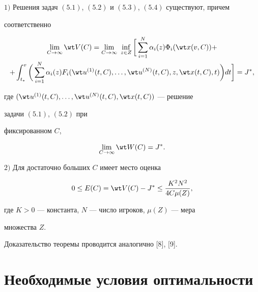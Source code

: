 \begin{thms} 


$1)$ Решения задач $(5.1)$, $(5.2)$ и $(5.3)$, $(5.4)$ существуют, причем 


соответственно 


\begin{multline*} 


\lim_{C\to\infty}\wt V(C)=\lim_{C\to\infty}\ \inf_{z\in Z}\bigg[ 


\sum^N_{i=1}\alpha_i(z)\Phi_i(\wt x(v,C))+\\ 


+\int^v_{t_*}\bigg(\sum^N_{i=1}\alpha_i(z)F_i 


(\wt u^{(1)}(t,C),\dotsc,\wt u^{(N)}(t,C),z,\wt x(t,C),t) 


\bigg)dt\bigg]=J^*, 


\end{multline*} 


где $(\wt u^{(1)}(t,C),\dotsc,\wt u^{(N)}(t,C),\wt x(t,C))$ --- решение 


задачи $(5.1)$, $(5.2)$ при 


фиксированном $C$, 


$$ 


\lim_{C\to\infty}\wt W(C)=J^*. 


$$ 


 


$2)$ Для достаточно больших $C$ имеет место оценка 


$$ 


0\le E(C)=\wt V(C)-J^*\le 


\frac{K^2N^2}{4C\mu(Z)}, 


$$ 


где $K>0$ --- константа, $N$ --- число игроков, $\mu(Z)$ --- мера 


множества $Z$. 


\end{thms} 


 


 


Доказательство теоремы проводится аналогично [8], [9]. 


 


 


\section{Необходимые условия оптимальности} 


